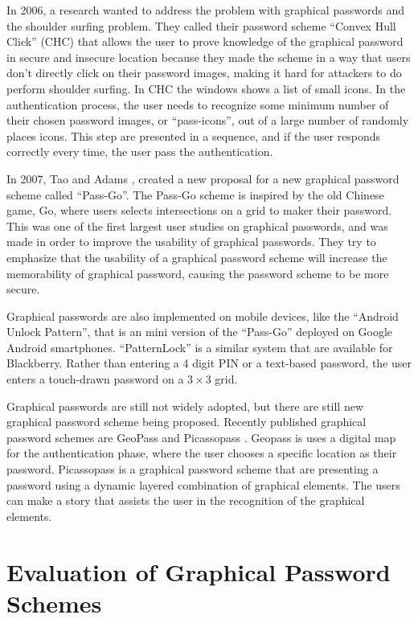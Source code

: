   In 2006, a research wanted to address the problem with graphical passwords and the shoulder surfing problem. They called their password scheme ``Convex Hull Click'' (CHC) \cite{Wiedenbeck} that allows the user to prove knowledge of the graphical password in secure and insecure location because they made the scheme in a way that users don't directly click on their password images, making it hard for attackers to do perform shoulder surfing. In CHC the windows shows a list of small icons. In the authentication process, the user needs to recognize some minimum number of their chosen password images, or ``pass-icons'', out of a large number of randomly places icons. This step are presented in a sequence, and if the user responds correctly every time, the user pass the authentication.
  
  In 2007, Tao and Adams \cite{Tao}, created a new proposal for a new graphical password scheme called ``Pass-Go''. The Pass-Go scheme is inspired by the old Chinese game, Go, where users selects intersections on a grid to maker their password. This was one of the first largest user studies on graphical passwords, and was made in order to improve the usability of graphical passwords. They try to emphasize that the usability of a graphical password scheme will increase the memorability of graphical password, causing the password scheme to be more secure.  

  Graphical passwords are also implemented on mobile devices, like the ``Android Unlock Pattern'', that is an mini version of the ``Pass-Go'' deployed on Google Android smartphones. ``PatternLock'' is a similar system that are available for Blackberry. Rather than entering a 4 digit PIN or a text-based password, the user enters a touch-drawn password on a $3\times3$ grid.

  Graphical passwords are still not widely adopted, but there are still new graphical password scheme being proposed. Recently published  graphical password schemes are GeoPass \cite{GeoPass} and Picassopass \cite{PicassoPass}. Geopass is uses a digital map for the authentication phase, where the user chooses a specific location as their password. Picassopass is a graphical password scheme that are presenting a password using a dynamic layered combination of graphical elements. The users can make a story that assists the user in the recognition of the graphical elements.

 \section{Evaluation of Graphical Password Schemes}

